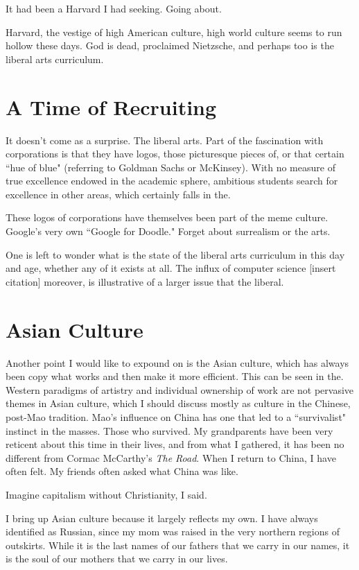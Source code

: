 \documentclass[12pt,letterpaper]{article}
\begin{document}
It had been a Harvard I had seeking.  Going about.

Harvard, the vestige of high American culture, high world culture seems to run hollow these days.  God is dead, proclaimed Nietzsche, and perhaps too is the liberal arts curriculum.

\section{A Time of Recruiting}
It doesn't come as a surprise.  The liberal arts.  Part of the fascination with corporations is that they have logos, those picturesque pieces of, or that certain ``hue of blue" (referring to Goldman Sachs or McKinsey).  With no measure of true excellence endowed in the academic sphere, ambitious students search for excellence in other areas, which certainly falls in the.  

These logos of corporations have themselves been part of the meme culture.  Google's very own ``Google for Doodle."  Forget about surrealism or the arts.

One is left to wonder what is the state of the liberal arts curriculum in this day and age, whether any of it exists at all.  The influx of computer science [insert citation] moreover, is illustrative of a larger issue that the liberal.

\section{Asian Culture}
Another point I would like to expound on is the Asian culture, which has always been copy what works and then make it more efficient.  This can be seen in the.  Western paradigms of artistry and individual ownership of work are not pervasive themes in Asian culture, which I should discuss mostly as culture in the Chinese, post-Mao tradition.  Mao's influence on China has one that led to a ``survivalist" instinct in the masses.  Those who survived.  My grandparents have been very reticent about this time in their lives, and from what I gathered, it has been no different from Cormac McCarthy's \textit{The Road}.  When I return to China, I have often felt.  My friends often asked what China was like.  

Imagine capitalism without Christianity, I said.

I bring up Asian culture because it largely reflects my own.  I have always identified as Russian, since my mom was raised in the very northern regions of outskirts.  While it is the last names of our fathers that we carry in our names, it is the soul of our mothers that we carry in our lives.
\end{document}
